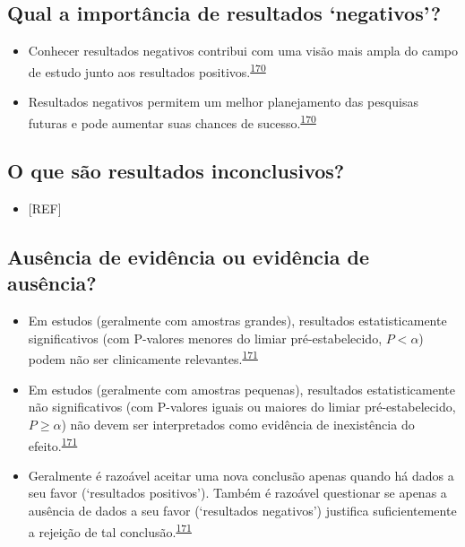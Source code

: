 \documentclass[
  a4paper,
]{book}
\providecommand{\tightlist}{%
  \setlength{\itemsep}{0pt}\setlength{\parskip}{0pt}}
\begin{document}
\hypertarget{qual-a-importuxe2ncia-de-resultados-negativos}{%
\subsection{Qual a importância de resultados `negativos'?}\label{qual-a-importuxe2ncia-de-resultados-negativos}}

\begin{itemize}
\item
  Conhecer resultados negativos contribui com uma visão mais ampla do campo de estudo junto aos resultados positivos.\textsuperscript{\protect\hyperlink{ref-weintraub2016}{170}}
\item
  Resultados negativos permitem um melhor planejamento das pesquisas futuras e pode aumentar suas chances de sucesso.\textsuperscript{\protect\hyperlink{ref-weintraub2016}{170}}
\end{itemize}

\hypertarget{o-que-suxe3o-resultados-inconclusivos}{%
\subsection{O que são resultados inconclusivos?}\label{o-que-suxe3o-resultados-inconclusivos}}

\begin{itemize}
\tightlist
\item
  {[}REF{]}
\end{itemize}

\hypertarget{ausuxeancia-de-eviduxeancia-ou-eviduxeancia-de-ausuxeancia}{%
\subsection{Ausência de evidência ou evidência de ausência?}\label{ausuxeancia-de-eviduxeancia-ou-eviduxeancia-de-ausuxeancia}}

\begin{itemize}
\item
  Em estudos (geralmente com amostras grandes), resultados estatisticamente significativos (com P-valores menores do limiar pré-estabelecido, \(P<\alpha\)) podem não ser clinicamente relevantes.\textsuperscript{\protect\hyperlink{ref-altman1995}{171}}
\item
  Em estudos (geralmente com amostras pequenas), resultados estatisticamente não significativos (com P-valores iguais ou maiores do limiar pré-estabelecido, \(P≥\alpha\)) não devem ser interpretados como evidência de inexistência do efeito.\textsuperscript{\protect\hyperlink{ref-altman1995}{171}}
\item
  Geralmente é razoável aceitar uma nova conclusão apenas quando há dados a seu favor (`resultados positivos'). Também é razoável questionar se apenas a ausência de dados a seu favor (`resultados negativos') justifica suficientemente a rejeição de tal conclusão.\textsuperscript{\protect\hyperlink{ref-altman1995}{171}}
\end{itemize}
\end{document}
